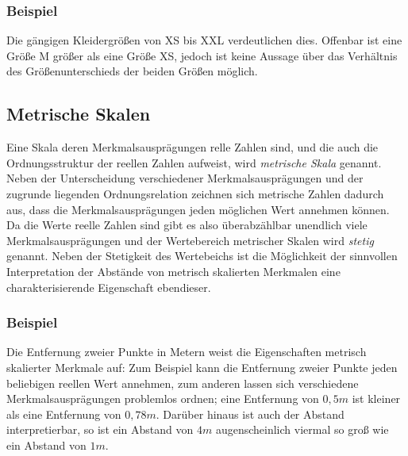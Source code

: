 \documentclass[fontsize=11pt]{scrartcl}
\begin{document}
                    \subsubsection{Beispiel}
                        Die gängigen Kleidergrößen von XS bis XXL verdeutlichen dies. Offenbar ist eine Größe M größer als eine Größe XS, jedoch ist keine Aussage über das Verhältnis des Größenunterschieds der beiden Größen möglich.
                \subsection{Metrische Skalen}
                    Eine Skala deren Merkmalsausprägungen relle Zahlen sind, und die auch die Ordnungsstruktur der reellen Zahlen aufweist, wird \emph{metrische Skala} genannt. Neben der Unterscheidung verschiedener Merkmalsausprägungen und der zugrunde liegenden Ordnungsrelation zeichnen sich metrische Zahlen dadurch aus, dass die Merkmalsausprägungen jeden möglichen Wert annehmen können. Da die Werte reelle Zahlen sind gibt es also überabzählbar unendlich viele Merkmalsausprägungen und der Wertebereich metrischer Skalen wird \emph{stetig} genannt. Neben der Stetigkeit des Wertebeichs ist die Möglichkeit der sinnvollen Interpretation der Abstände von metrisch skalierten Merkmalen eine charakterisierende Eigenschaft ebendieser.
                    \cite{kohn2005}
                    \subsubsection{Beispiel}
                        Die Entfernung zweier Punkte in Metern weist die Eigenschaften metrisch skalierter Merkmale auf: Zum Beispiel kann die Entfernung zweier Punkte jeden beliebigen reellen Wert annehmen, zum anderen lassen sich verschiedene Merkmalsausprägungen problemlos ordnen; eine Entfernung von $ 0,5m $ ist kleiner als eine Entfernung von $ 0,78m $. Darüber hinaus ist auch der Abstand interpretierbar, so ist ein Abstand von $4m$ augenscheinlich viermal so groß wie ein Abstand von $1m$.
\end{document}
